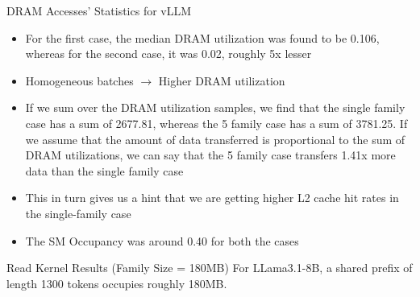 \documentclass[Serif, 10pt, brown]{beamer}
\theoremstyle{example}
\theoremstyle{plain}
\begin{document}
\begin{frame}{DRAM Accesses' Statistics for vLLM}
\begin{itemize}
        \item For the first case, the median DRAM utilization was found to be 0.106, whereas for the second case, it was 0.02, roughly 5x lesser
        \item Homogeneous batches $\rightarrow$ Higher DRAM utilization 
        \item If we sum over the DRAM utilization samples, we find that the single family case has a sum of 2677.81, whereas the 5 family case has a sum of 3781.25. If we assume that the amount of data transferred is proportional to the sum of DRAM utilizations, we can say that the 5 family case transfers 1.41x more data than the single family case
        \item This in turn gives us a hint that we are getting higher L2 cache hit rates in the single-family case
        \item The SM Occupancy was around 0.40 for both the cases
\end{itemize}
\end{frame}




\begin{frame}{Read Kernel Results (Family Size = 180MB)}
For LLama3.1-8B, a shared prefix of length 1300 tokens occupies roughly 180MB.
    \begin{table}[ht]
\centering
{}
\end{table}

\end{frame}
\end{document}
